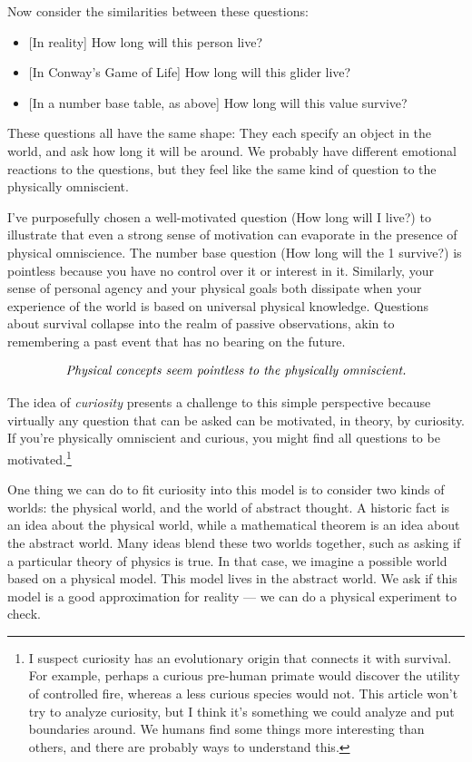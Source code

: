 \documentclass[11pt, oneside]{article}   	%
\begin{document}
\pagebreak

Now consider the similarities between these questions:
\begin{itemize}
    \item{} [In reality] How long will this person live?
    \item{} [In Conway's Game of Life] How long will this glider live?
    \item{} [In a number base table, as above] How long will this value survive?
\end{itemize}
These questions all have the same shape: They each specify an
object in the world, and ask how long it will be around.
We probably have different emotional reactions to the questions, but they feel
like the same kind of question to the physically omniscient.

I've
purposefully chosen a well-motivated question (How long will I
live?) to illustrate that even a strong sense of motivation can evaporate
in the presence of physical omniscience.
The number base question (How long will the 1 survive?) is
pointless because you have no control over it or interest in it.
Similarly, your sense of personal agency
and your physical goals both dissipate when your experience of the world is
based
on universal physical knowledge. Questions about survival collapse into the
realm of passive observations, akin to remembering a past event that has no
bearing on the future.

\begin{equation}\label{eq3}
    \text{\em Physical concepts seem pointless to the physically omniscient.}
\end{equation}

The idea of {\em curiosity} presents a challenge to
this simple perspective because
virtually any question that can be asked can be motivated, in theory, by
curiosity. If you're physically omniscient and curious, you might find all
questions to be motivated.\footnote{I suspect curiosity has an evolutionary
origin that connects it with survival. For example, perhaps a curious pre-human
primate would discover the utility of controlled fire, whereas a less curious
species would not. This article won't try to analyze curiosity, but I think it's
something we could analyze and put boundaries around. We humans find some things
more interesting than others, and there are probably ways to understand this.}

One thing we can do to fit curiosity into this model is to consider two kinds
of worlds: the physical world, and the world of abstract thought.
A historic fact is an idea about the physical world, while a mathematical
theorem is an idea about the abstract world.
Many ideas blend these two worlds together, such as asking if a particular
theory of physics is true. In that case, we imagine a possible world based on a
physical model. This model lives in the abstract world. We ask if this model
is a good approximation for reality ---
we can do a physical experiment to check.
\end{document}
